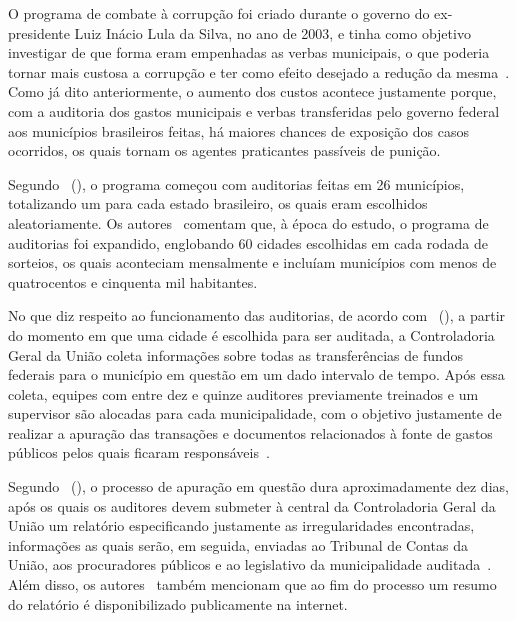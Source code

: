 \documentclass[
	12pt,				%
	openright,			%
	twoside,			%
	a4paper,			%
	openany,
	english,			%
	brazil				%
	]{abntex2}
\begin{document}
O programa de combate à corrupção foi criado durante o governo do ex-presidente Luiz Inácio Lula da Silva, no ano de 2003, e tinha como objetivo investigar de que forma eram empenhadas as verbas municipais, o que poderia tornar mais custosa a corrupção e ter como efeito desejado a redução da mesma~\cite{ferraz2008exposing}. Como já dito anteriormente, o aumento dos custos acontece justamente porque, com a auditoria dos gastos municipais e verbas transferidas pelo governo federal aos municípios brasileiros feitas, há maiores chances de exposição dos casos ocorridos, os quais tornam os agentes praticantes passíveis de punição.

Segundo ~(\citeyear{ferraz2008exposing}), o programa começou com auditorias feitas em 26 municípios, totalizando um para cada estado brasileiro, os quais eram escolhidos aleatoriamente. Os autores~\cite{ferraz2008exposing} comentam que, à época do estudo, o programa de auditorias foi expandido, englobando 60 cidades escolhidas em cada rodada de sorteios, os quais aconteciam mensalmente e incluíam municípios com menos de quatrocentos e cinquenta mil habitantes.

No que diz respeito ao funcionamento das auditorias, de acordo com ~(\citeyear{ferraz2008exposing}), a partir do momento em que uma cidade é escolhida para ser auditada, a Controladoria Geral da União coleta informações sobre todas as transferências de fundos federais para o município em questão em um dado intervalo de tempo. Após essa coleta, equipes com entre dez e quinze auditores previamente treinados e um supervisor são alocadas para cada municipalidade, com o objetivo justamente de realizar a apuração das transações e documentos relacionados à fonte de gastos públicos pelos quais ficaram responsáveis~\cite{ferraz2008exposing}.

Segundo ~(\citeyear{ferraz2008exposing}), o processo de apuração em questão dura aproximadamente dez dias, após os quais os auditores devem submeter à central da Controladoria Geral da União um relatório especificando justamente as irregularidades encontradas, informações as quais serão, em seguida, enviadas ao Tribunal de Contas da União, aos procuradores públicos e ao legislativo da municipalidade auditada~\cite{ferraz2008exposing}. Além disso, os autores~\cite{ferraz2008exposing} também mencionam que ao fim do processo um resumo do relatório é disponibilizado publicamente na internet.
\end{document}
